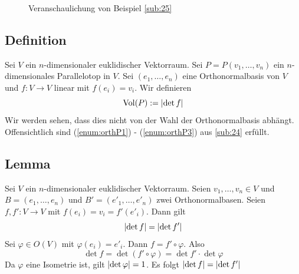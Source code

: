 \begin{figure}[h]
	\caption{Veranschaulichung von Beispiel \ref{sub:25}}
\end{figure}

\subsection[Definition des Volumen per Determinante]{Definition} %
\label{sub:26}
Sei $V$ ein $n$-dimensionaler euklidischer Vektorraum. Sei $P=P(v_1, \ldots , v_n)$ ein $n$-dimensionales Parallelotop in $V$. Sei $(e_1, \ldots , e_n)$ eine
Orthonormalbasis von $V$ und $f : V \to V$ linear mit $f(e_i)=v_i$. Wir definieren 
\[
	\Vol(P) := \abs*{\det f} 
\]
Wir werden sehen, dass dies nicht von der Wahl der Orthonormalbasis abhängt. Offensichtlich sind (\ref{enum:orthP1}) - (\ref{enum:orthP3}) aus \ref{sub:24} erfüllt.

\subsection[Lemma über die betragliche Gleichheit von Determinanten]{Lemma} %
\label{sub:27}
Sei $V$ ein $n$-dimensionaler euklidischer Vektorraum. Seien $v_1, \ldots , v_n \in V$ und $B=(e_1, \ldots , e_n)$ und $B'=(e'_1 , \ldots , e'_n)$ zwei Orthonormalbasen.
Seien $f,f' : V \to V$ mit $f(e_i)= v_i = f'(e'_i)$. Dann gilt
\[
	\abs*{\det f} = \abs*{\det f'}  
\]
Sei $\varphi \in O(V)$ mit $\varphi(e_i) = e'_i$. Dann $f = f' \circ \varphi$. Also 
\[
	\det f = \det ( f' \circ \varphi) = \det f' \cdot \det \varphi
\]
Da $\varphi$ eine Isometrie ist, gilt  $\abs*{\det \varphi} = 1 $. Es folgt $\abs*{\det f} = \abs*{\det f'}  $ \bewende

